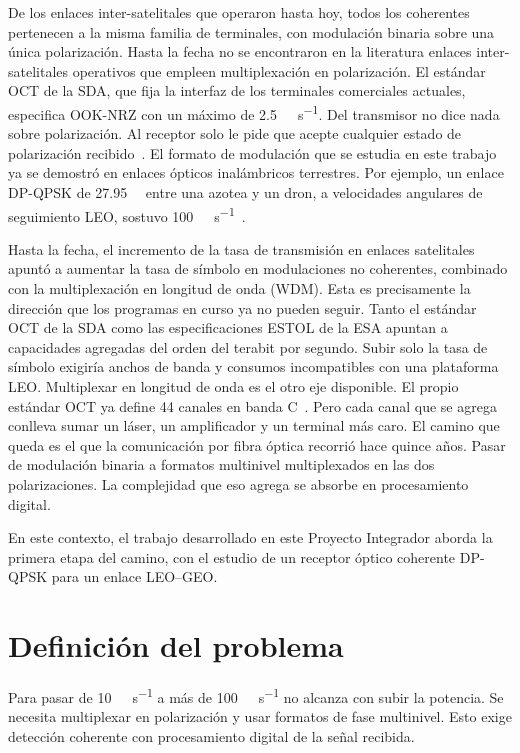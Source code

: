 De los enlaces inter-satelitales que operaron hasta hoy, todos los coherentes
pertenecen a la misma familia de terminales, con modulaci\'on binaria sobre una
\'unica polarizaci\'on. Hasta la fecha no se encontraron en la literatura
enlaces inter-satelitales operativos que empleen multiplexaci\'on en
polarizaci\'on. El est\'andar OCT de la SDA, que fija la interfaz de los
terminales comerciales actuales, especifica OOK-NRZ con un m\'aximo de
\SI{2.5}{\giga\bit\per\second}. Del transmisor no dice nada sobre
polarizaci\'on. Al receptor solo le pide que acepte cualquier estado de
polarizaci\'on recibido~\cite{sda_oct}. El formato de modulaci\'on que se
estudia en este trabajo ya se demostr\'o en enlaces \'opticos inal\'ambricos
terrestres. Por ejemplo, un enlace DP-QPSK de \SI{27.95}{\giga\baud} entre una
azotea y un dron, a velocidades angulares de seguimiento LEO, sostuvo
\SI{100}{\giga\bit\per\second}~\cite{scirep2022}.

Hasta la fecha, el incremento de la tasa de transmisi\'on en enlaces
satelitales apunt\'o a aumentar la tasa de s\'imbolo en modulaciones no
coherentes, combinado con la multiplexaci\'on en longitud de onda (WDM). Esta
es precisamente la direcci\'on que los programas en curso ya no pueden seguir.
Tanto el est\'andar OCT de la SDA como las especificaciones ESTOL de la ESA
apuntan a capacidades agregadas del orden del terabit por segundo. Subir solo
la tasa de s\'imbolo exigir\'ia anchos de banda y consumos incompatibles con
una plataforma LEO. Multiplexar en longitud de onda es el otro eje disponible.
El propio est\'andar OCT ya define \num{44} canales en banda
C~\cite{sda_oct}. Pero cada canal que se agrega conlleva sumar un l\'aser, un
amplificador y un terminal m\'as caro. El camino que queda es el que la
comunicaci\'on por fibra \'optica recorri\'o hace quince a\~nos. Pasar de
modulaci\'on binaria a formatos multinivel multiplexados en las dos
polarizaciones. La complejidad que eso agrega se absorbe en procesamiento
digital.

En este contexto, el trabajo desarrollado en este Proyecto Integrador aborda la
primera etapa del camino, con el estudio de un receptor \'optico coherente
DP-QPSK para un enlace LEO--GEO.

\section{Definici\'on del problema}
\label{sec:intro-problema}

Para pasar de \SI{10}{\giga\bit\per\second} a m\'as de
\SI{100}{\giga\bit\per\second} no alcanza con subir la potencia. Se necesita
multiplexar en polarizaci\'on y usar formatos de fase multinivel. Esto exige
detecci\'on coherente con procesamiento digital de la se\~nal recibida.


